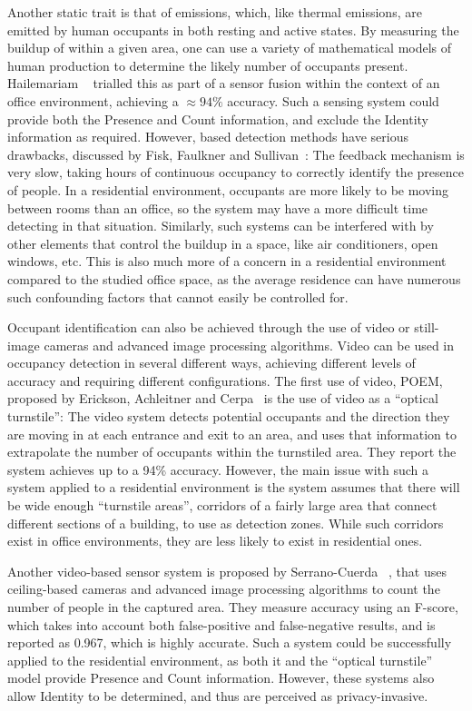 \documentclass[../thesis/thesis.tex]{subfiles}
\begin{document}
Another static trait is that of \cdi emissions, which, like thermal emissions, are emitted by human occupants in both resting and active states. By measuring the buildup of \cdi within a given area, one can use a variety of mathematical models of human \cdi production to determine the likely number of occupants present. Hailemariam \etal~\cite{hailemariam2011real} trialled this as part of a sensor fusion within the context of an office environment, achieving a $\approx94\%$ accuracy. Such a sensing system could provide both the Presence and Count information, and exclude the Identity information as required. However, \cdi based detection methods have serious drawbacks, discussed by Fisk, Faulkner and Sullivan~\cite{fisk2006accuracy}: The \cdi feedback mechanism is very slow, taking hours of continuous occupancy to correctly identify the presence of people. In a residential environment, occupants are more likely to be moving between rooms than an office, so the system may have a more difficult time detecting in that situation. Similarly, such systems can be interfered with by other elements that control the \cdi buildup in a space, like air conditioners, open windows, etc. This is also much more of a concern in a residential environment compared to the studied office space, as the average residence can have numerous such confounding factors that cannot easily be controlled for.

Occupant identification can also be achieved through the use of video or still-image cameras and advanced image processing algorithms. Video can be used in occupancy detection in several different ways, achieving different levels of accuracy and requiring different configurations. The first use of video, POEM, proposed by Erickson, Achleitner and Cerpa~\cite{erickson2013poem} is the use of video as a ``optical turnstile'': The video system detects potential occupants and the direction they are moving in at each entrance and exit to an area, and uses that information to extrapolate the number of occupants within the turnstiled area. They report the system achieves up to a 94\% accuracy. However, the main issue with such a system applied to a residential environment is the system assumes that there will be wide enough ``turnstile areas'', corridors of a fairly large area that connect different sections of a building, to use as detection zones. While such corridors exist in office environments, they are less likely to exist in residential ones.

Another video-based sensor system is proposed by Serrano-Cuerda \etal~\cite{serrano2013efficient}, that uses ceiling-based cameras and advanced image processing algorithms to count the number of people in the captured area. They measure accuracy using an F-score, which takes into account both false-positive and false-negative results, and is reported as 0.967, which is highly accurate. Such a system could be successfully applied to the residential environment, as both it and the ``optical turnstile'' model provide Presence and Count information. However, these systems also allow Identity to be determined, and thus are perceived as privacy-invasive.
\end{document}
